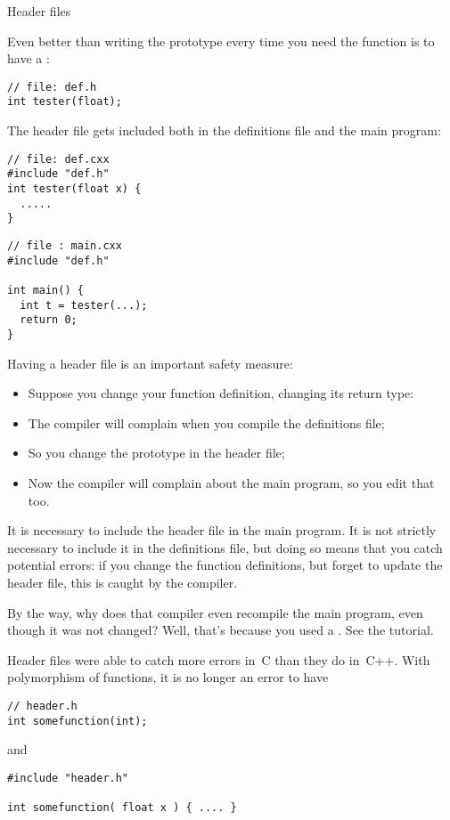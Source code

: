  {Header files}
\label{sec:hfile}

Even better than writing the prototype every time you need the
function is to have a :
\begin{verbatim}
// file: def.h
int tester(float);
\end{verbatim}
The header file gets included both in the definitions file and the
main program:
\begin{multicols}{2}  
\begin{verbatim}
// file: def.cxx
#include "def.h"
int tester(float x) {
  .....
}
\end{verbatim}
\vfill\columnbreak
\begin{verbatim}
// file : main.cxx
#include "def.h"

int main() {
  int t = tester(...);
  return 0;
}
\end{verbatim}
\end{multicols}

Having a header file is an important safety measure:
\begin{itemize}
\item Suppose you change your function definition, changing its return
  type:
\item The compiler will complain when you compile the definitions
  file;
\item So you change the prototype in the header file;
\item Now the compiler will complain about the main program, so you
  edit that too.
\end{itemize}

It is necessary to include the header file in the main program. It is
not strictly necessary to include it in the definitions file, but
doing so means that you catch potential errors: if you change the
function definitions, but forget to update the header file, this is
caught by the compiler.

\begin{remark}
  By the way, why does that compiler even recompile the main program,
  even though it was not changed? Well, that's because you used a
  . See the tutorial.
\end{remark}
\begin{remark}
  Header files were able to catch more errors in~C than they do
  in~C++. With polymorphism of functions, it is no longer an error to
  have 
\begin{verbatim}
// header.h
int somefunction(int);
\end{verbatim}
and
\begin{verbatim}
#include "header.h"

int somefunction( float x ) { .... }
\end{verbatim}
\end{remark}

